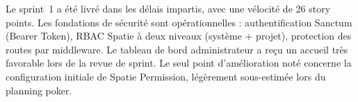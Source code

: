 \begin{chapconclusion}
Le sprint~1 a été livré dans les délais impartis, avec une vélocité de 26 story points.
Les fondations de sécurité sont opérationnelles : authentification Sanctum (Bearer Token),
RBAC Spatie à deux niveaux (système + projet), protection des routes par middleware.
Le tableau de bord administrateur a reçu un accueil très favorable lors de la revue de
sprint. Le seul point d'amélioration noté concerne la configuration initiale de Spatie
Permission, légèrement sous-estimée lors du planning poker.
\end{chapconclusion}
